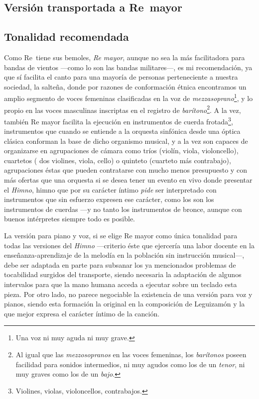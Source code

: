 
\subsection[Versión transportada a Re\bemoltxt\ mayor]{Versión transportada a Re\bemol\ mayor}
\label{subsec:transporte-reb}



\subsection{Tonalidad recomendada}
\label{subsec:tonalidad-recomendada}

Como Re\bemoltxt\ tiene sus bemoles, \emph{Re mayor}, aunque no sea la más facilitadora para bandas de vientos ---como lo son las bandas militares---, es mi recomendación, ya que sí facilita el canto para una mayoría de personas perteneciente a nuestra sociedad, la salteña, donde por razones de conformación étnica encontramos un amplio segmento de voces femeninas clasificadas en la voz de \emph{mezzasoprano}\footnote{Una voz ni muy aguda ni muy grave.}, y lo propio en las voces masculinas inscriptas en el registro de \emph{barítono}\footnote{Al igual que las \emph{mezzosopranos} en las voces femeninas, los \emph{barítonos} poseen facilidad para sonidos intermedios, ni muy agudos como los de un \emph{tenor}, ni muy graves como los de un \emph{bajo}.}. A la vez, también Re mayor facilita la ejecución en instrumentos de cuerda frotada\footnote{Violines, violas, violoncellos, contrabajos.}, instrumentos que cuando se entiende a la orquesta sinfónica desde una óptica clásica conforman la base de dicho organismo musical, y a la vez son capaces de organizarse en agrupaciones de cámara como tríos (violín, viola, violoncello), cuartetos ( dos violines, viola, cello) o quinteto (cuarteto más contrabajo), agrupaciones éstas que pueden contratarse con mucho menos presupuesto y con más ofertas que una orquesta si se desea tener un evento en vivo donde presentar el \emph{Himno}, himno que por su carácter íntimo \emph{pide} ser interpretado con instrumentos que sin esfuerzo expresen ese carácter, como los son los instrumentos de cuerdas ---y no tanto los instrumentos de bronce, aunque con buenos intérpretes siempre todo es posible.

La versión para piano y voz, si se elige Re mayor como única tonalidad para todas las versiones del \emph{Himno} ---criterio éste que ejercería una labor docente en la enseñanza-aprendizaje de la melodía en la población sin instrucción musical---, debe ser adaptada en parte para subsanar los ya mencionados problemas de tocabilidad surgidos del transporte, siendo necesaria la adaptación de algunos intervalos para que la mano humana acceda a ejecutar sobre un teclado esta pieza. Por otro lado, no parece negociable la existencia de una versión para voz y pianos, siendo esta formación la original en la composición de Leguizamón y la que mejor expresa el carácter íntimo de la canción.


